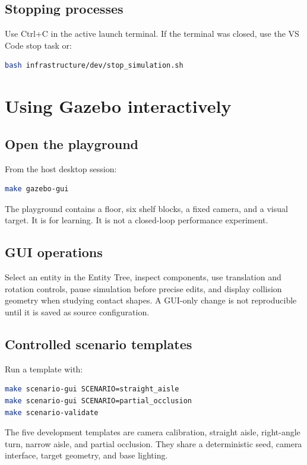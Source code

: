 \documentclass[11pt,oneside,openany]{book}
\begin{document}
\section{Stopping processes}

Use Ctrl+C in the active launch terminal. If the terminal was closed, use the VS Code stop task or:
\begin{lstlisting}[language=bash]
bash infrastructure/dev/stop_simulation.sh
\end{lstlisting}

\chapter{Using Gazebo interactively}

\section{Open the playground}

From the host desktop session:
\begin{lstlisting}[language=bash]
make gazebo-gui
\end{lstlisting}
The playground contains a floor, six shelf blocks, a fixed camera, and a visual target. It is for learning. It is not a closed-loop performance experiment.

\section{GUI operations}

Select an entity in the Entity Tree, inspect components, use translation and rotation controls, pause simulation before precise edits, and display collision geometry when studying contact shapes. A GUI-only change is not reproducible until it is saved as source configuration.

\section{Controlled scenario templates}

Run a template with:
\begin{lstlisting}[language=bash]
make scenario-gui SCENARIO=straight_aisle
make scenario-gui SCENARIO=partial_occlusion
make scenario-validate
\end{lstlisting}

The five development templates are camera calibration, straight aisle, right-angle turn, narrow aisle, and partial occlusion. They share a deterministic seed, camera interface, target geometry, and base lighting.
\end{document}
